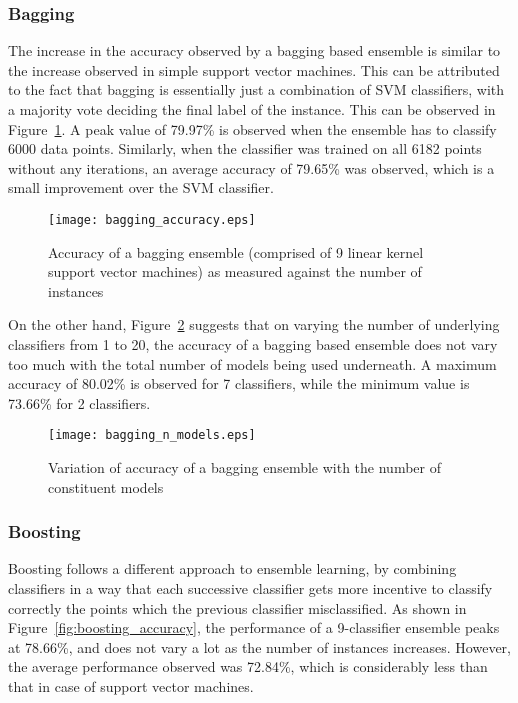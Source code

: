 \subsubsection{Bagging}
The increase in the accuracy observed by a bagging based ensemble is similar to the increase observed in simple support vector machines. This can be attributed to the fact that bagging is essentially just a combination of SVM classifiers, with a majority vote deciding the final label of the instance. This can be observed in Figure~\ref{fig:bagging_accuracy}. A peak value of 79.97\% is observed when the ensemble has to classify 6000 data points. Similarly, when the classifier was trained on all 6182 points without any iterations, an average accuracy of 79.65\% was observed, which is a small improvement over the SVM classifier.\\

\begin{figure}
    \centering
    \texttt{[image: bagging\_accuracy.eps]}
    \caption{Accuracy of a bagging ensemble (comprised of 9 linear kernel support vector machines) as measured against the number of instances}
    \label{fig:bagging_accuracy}
\end{figure}

On the other hand, Figure~\ref{fig:bagging_n_models} suggests that on varying the number of underlying classifiers from 1 to 20, the accuracy of a bagging based ensemble does not vary too much with the total number of models being used underneath. A maximum accuracy of 80.02\% is observed for 7 classifiers, while the minimum value is 73.66\% for 2 classifiers.

\begin{figure}
    \centering
    \texttt{[image: bagging\_n\_models.eps]}
    \caption{Variation of accuracy of a bagging ensemble with the number of constituent models}
    \label{fig:bagging_n_models}
\end{figure}

\subsubsection{Boosting}
Boosting follows a different approach to ensemble learning, by combining classifiers in a way that each successive classifier gets more incentive to classify correctly the points which the previous classifier misclassified. As shown in Figure~\ref{fig:boosting_accuracy}, the performance of a 9-classifier ensemble peaks at 78.66\%, and does not vary a lot as the number of instances increases. However, the average performance observed was 72.84\%, which is considerably less than that in case of support vector machines.

